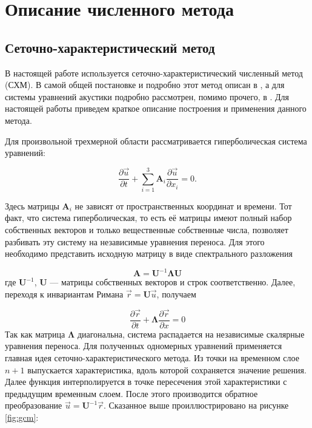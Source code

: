 \section{Описание численного метода}
\label{sec:Chapter2} 

\subsection{Сеточно-характеристический метод}
В настоящей работе используется сеточно-характеристический численный метод (СХМ). В самой общей постановке и подробно этот метод описан в \cite{kholodov}, а для системы уравнений акустики подробно рассмотрен, помимо прочего, в \cite{kazakov}. Для настоящей работы приведем краткое описание построения и применения данного метода. 

Для произвольной трехмерной области рассматривается гиперболическая система уравнений: 

\begin{equation}
	\frac{\partial \vec{u}}{\partial t}+\sum_{i=1}^3 \mathbf{A}_i \frac{\partial \vec{u}}{\partial x_i}=0 .
\end{equation}

Здесь матрицы $\mathbf{A}_i$ не зависят от пространственных координат и времени. Тот факт, что система гиперболическая, то есть её матрицы имеют полный набор собственных векторов и только вещественные собственные числа, позволяет разбивать эту систему на независимые уравнения переноса. Для этого необходимо представить исходную матрицу в виде спектрального разложения

\begin{equation}
	\mathbf{A}=\mathbf{U}^{-1} \boldsymbol{\Lambda} \mathbf{U}
\end{equation}
где $\mathbf{U}^{-1}$, $\mathbf{U}$ --- матрицы собственных векторов и строк соответственно. Далее, переходя к инвариантам Римана $\vec{r} = \mathbf{U} \vec{u}$, получаем

\begin{equation}
	\frac{\partial \vec{r}}{\partial t}+\boldsymbol{\Lambda} \frac{\partial \vec{r}}{\partial x}=0
\end{equation}
Так как матрица $\boldsymbol{\Lambda}$ диагональна, система распадается на независимые скалярные уравнения переноса. Для полученных одномерных уравнений применяется главная идея сеточно-характеристического метода. Из точки на временном слое $n+1$ выпускается характеристика, вдоль которой сохраняется значение решения. Далее функция интерполируется в точке пересечения этой характеристики с предыдущим временным слоем. После этого производится обратное преобразование $\vec{u} = \mathbf{U}^{-1} \vec{r}$. Сказанное выше проиллюстрировано на рисунке \ref{fig:gcm}:

